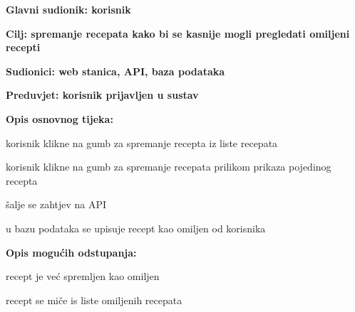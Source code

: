 					\noindent {}
					\begin{packed_item}
						\item \textbf{Glavni sudionik: korisnik}
						\item  \textbf{Cilj: spremanje recepata kako bi se kasnije mogli pregledati omiljeni recepti}
						\item  \textbf{Sudionici: web stanica, API, baza podataka}
						\item  \textbf{Preduvjet: korisnik prijavljen u sustav}
						
						\item  \textbf{Opis osnovnog tijeka:}
						\item[] \begin{packed_enum}
							\item[1.a] korisnik klikne na gumb za spremanje recepta iz liste recepata
							\item[1.b] korisnik klikne na gumb za spremanje recepata prilikom prikaza pojedinog recepta
							\item[2.] šalje se zahtjev na API
							\item[3.] u bazu podataka se upisuje recept kao omiljen od korisnika
						\end{packed_enum}
						
						\item  \textbf{Opis mogućih odstupanja:}
						\item[] \begin{packed_item}
							\item[10.a] recept je već spremljen kao omiljen
							\begin{packed_enum}
								\item recept se miče is liste omiljenih recepata
							\end{packed_enum}
						\end{packed_item}
					\end{packed_item}
				
				
				
